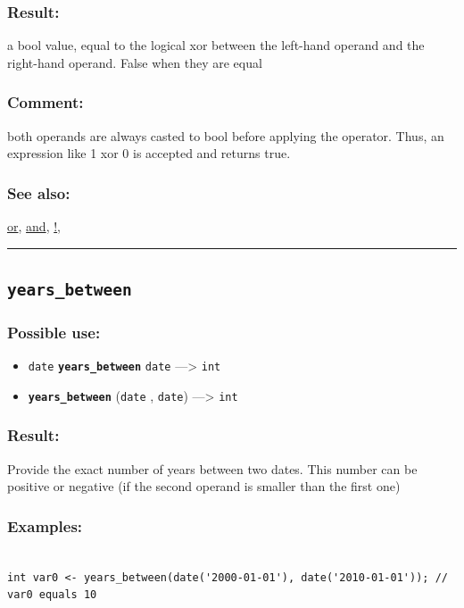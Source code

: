 \documentclass[]{book}
\providecommand{\tightlist}{%
  \setlength{\itemsep}{0pt}\setlength{\parskip}{0pt}}
\theoremstyle{definition}
\theoremstyle{definition}
\theoremstyle{definition}
\theoremstyle{remark}
\begin{document}
\subsubsection{Result:}\label{result-545}

a bool value, equal to the logical xor between the left-hand operand and
the right-hand operand. False when they are equal

\subsubsection{Comment:}\label{comment-114}

both operands are always casted to bool before applying the operator.
Thus, an expression like 1 xor 0 is accepted and returns true.

\subsubsection{See also:}\label{see-also-226}

\href{operators-n-to-r.html\#or}{or},
\href{operators-a-to-a.html\#and}{and},
\href{operators-a-to-a.html\#!}{!},

\begin{center}\rule{0.5\linewidth}{\linethickness}\end{center}

\subsection{\texorpdfstring{\texttt{years\_between}}{years\_between}}\label{years_between}

\subsubsection{Possible use:}\label{possible-use-567}

\begin{itemize}
\tightlist
\item
  \texttt{date} \textbf{\texttt{years\_between}} \texttt{date}
  ---\textgreater{} \texttt{int}
\item
  \textbf{\texttt{years\_between}} (\texttt{date} , \texttt{date})
  ---\textgreater{} \texttt{int}
\end{itemize}

\subsubsection{Result:}\label{result-546}

Provide the exact number of years between two dates. This number can be
positive or negative (if the second operand is smaller than the first
one)

\subsubsection{Examples:}\label{examples-391}

\begin{verbatim}
 
int var0 <- years_between(date('2000-01-01'), date('2010-01-01')); // var0 equals 10
\end{verbatim}

\printindex
\end{document}
